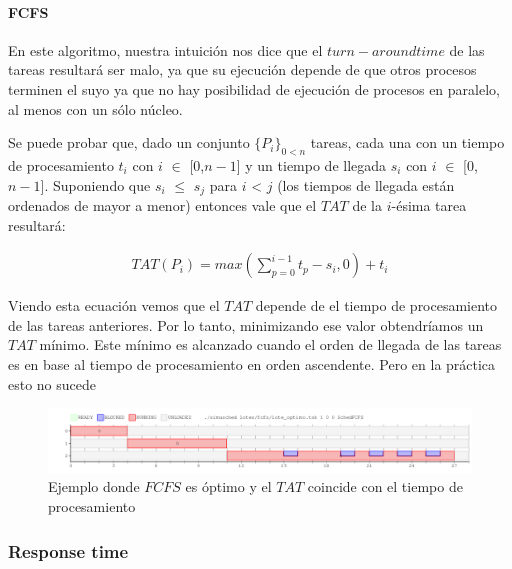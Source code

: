 \paragraph{FCFS}

En este algoritmo, nuestra intuici\'on nos dice que el $turn-around time$ de las tareas resultar\'a ser malo, ya que su ejecuci\'on depende de que otros procesos terminen el suyo ya que no hay posibilidad de ejecuci\'on de procesos en paralelo, al menos con un sólo núcleo.

\begin{figure}
	
\end{figure}



Se puede probar que, dado un conjunto $\{P_{i}\}_{0 < n}$ tareas, cada una con un tiempo de procesamiento $t_{i}$ con $i$ $\in$ [$0$,$n-1$] y un tiempo de llegada $s_{i}$ con $i$ $\in$ [$0$, $n-1$]. Suponiendo que $s_{i}$ $\leq$ $s_{j}$ para $i$ < $j$ (los tiempos de llegada están ordenados de mayor a menor) entonces vale que el $TAT$ de la $i$-ésima tarea resultará:

\begin{align*}
TAT(P_{i}) = max\left(\sum_{p=0}^{i-1}t_{p} - s_{i}, 0\right) + t_{i}
\end{align*}

Viendo esta ecuación vemos que el $TAT$ depende de el tiempo de procesamiento de las tareas anteriores. Por lo tanto, minimizando ese valor obtendríamos un $TAT$ mínimo. Este mínimo es alcanzado cuando el orden de llegada de las tareas es en base al tiempo de procesamiento en orden ascendente. Pero en la práctica esto no sucede
  
\begin{figure}
\includegraphics[scale=0.4]{FCFS/optimo2.png}
\caption{Ejemplo donde $FCFS$ es óptimo y el $TAT$ coincide con el tiempo de procesamiento}
\end{figure}


\subsubsection{Response time}
